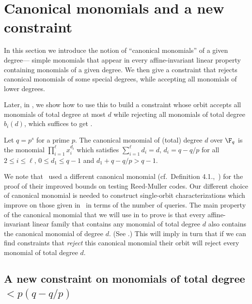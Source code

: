 \section{Canonical monomials and a new constraint}
\label{sec:main}

In this section we introduce the notion of ``canonical monomials''
of a given degree---%
simple %
monomials that appear in every affine-invariant
linear property containing monomials of a given degree.
We then give a constraint that rejects canonical monomials of
some special degrees, while accepting all monomials of lower degrees.

Later, in , we show how to use this to build
a constraint whose orbit accepts all monomials of total degree at most $d$ while rejecting
all monomials of total degree $b_i(d)$, which suffices to get .

\begin{definition}\label{defn:canonical-monomial}
Let $q=p^s$ for a prime $p$. The canonical monomial of (total) degree $d$ over $\F_q$ is the monomial $\prod_{i=1}^{\ell} x_i^{d_i} $
which satisfies $\sum_{i=1}^{\ell} d_i = d$,
$d_i = q-q/p$ for all $2 \leq i \leq \ell$,  $0 \leq d_1 \leq q-1$ and  $d_1 + q-q/p > q -1$.
\end{definition}

We note that~\cite{HSS11} used a different canonical monomial (cf.\ Definition 4.1.,~\cite{HSS11}) for the proof of their improved bounds on testing Reed-Muller codes.
Our different choice of canonical monomial is needed to construct single-orbit characterizations which improve on those given in~\cite{HSS11}
in terms of the number of queries.
The main property of the canonical monomial that we will use in
to prove  is that
every affine-invariant linear family that contains any monomial
of total degree $d$ also contains the canonical monomial of degree $d$.
(See .) 
This will imply in turn that if we can find constraints
that \emph{reject} this canonical monomial their orbit will reject every monomial
of total degree $d$.

\subsection{A new constraint on monomials of total degree
  \texorpdfstring{$< p(q - q/p)$}{< p(p - q/p)}}\label{sec:main-lemma}


